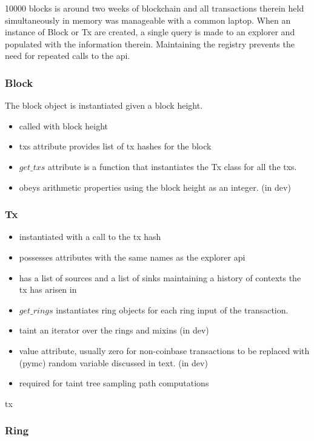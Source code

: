 10000 blocks is around two weeks of blockchain and all transactions therein held simultaneously in memory was manageable with a common laptop.
When an instance of Block or Tx are created, a single query is made to an explorer and populated with the information therein.  
Maintaining the registry prevents the need for repeated calls to the api.

\subsubsection{Block}

The block object is instantiated given a block height.
\begin{itemize}
\item called with block height
\item txs attribute provides list of tx hashes for the block
\item $get\_txs$ attribute is a function that instantiates the Tx class for all the txs.
\item obeys arithmetic properties using the block height as an integer.  (in dev) 
\end{itemize}

\subsubsection{Tx}

\begin{itemize}
\item instantiated with a call to the tx hash
\item possesses attributes with the same names as the explorer api
\item has a list of sources and a list of sinks maintaining a history of contexts the tx has arisen in
\item $get\_rings$ instantiates ring objects for each ring input of the transaction.
\item taint an iterator over the rings and mixins (in dev)
\item value attribute, usually zero for non-coinbase transactions to be replaced with (pymc) random variable discussed in text.  (in dev)
\item required for taint tree sampling path computations
\end{itemize}
\gls{tx}

\subsubsection{Ring}

